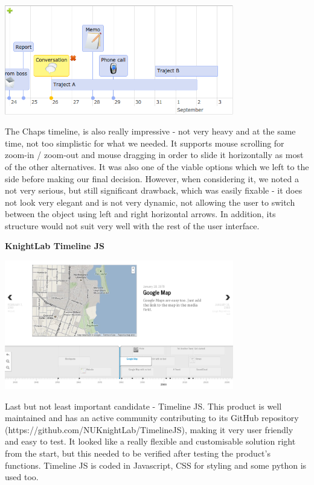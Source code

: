 \documentclass{l3proj}
\begin{document}
\includegraphics[width=0.75\textwidth]{images/Chaps.png}

The Chaps timeline, is also really impressive - not very heavy and at the same time, not too simplistic for what we needed. It supports mouse scrolling for zoom-in / zoom-out and mouse dragging in order to slide it horizontally as most of the other alternatives. It was also one of the viable options which we left to the side before making our final decision. However, when considering it, we noted a not very serious, but still significant drawback, which was easily fixable - it does not look very elegant and is not very dynamic, not allowing the user to switch between the object using left and right horizontal arrows. In addition, its structure would not suit very well with the rest of the user interface.


\textbf{KnightLab Timeline JS}

\includegraphics[width=0.75\textwidth]{images/timeline-example.png}

Last but not least important candidate - Timeline JS. This product is well maintained and has an active community contributing to its GitHub repository (https://github.com/NUKnightLab/TimelineJS), making it very user friendly and easy to test. It looked like a really flexible and customisable solution right from the start, but this needed to be verified after testing the product's functions. Timeline JS is coded in Javascript, CSS for styling and some python is used too.
\end{document}
